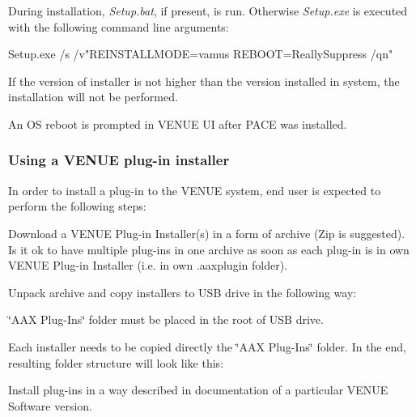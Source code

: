  During installation, {\itshape Setup.\+bat}, if present, is run. Otherwise {\itshape Setup.\+exe} is executed with the following command line arguments\+:

 {\ttfamily Setup.\+exe /s /v"R\+E\+I\+N\+S\+T\+A\+L\+L\+M\+O\+DE=vamus R\+E\+B\+O\+OT=Really\+Suppress /qn"}

 If the version of installer is not higher than the version installed in system, the installation will not be performed.

 An OS reboot is prompted in V\+E\+N\+UE UI after P\+A\+CE was installed.

\hypertarget{a00849_subsection__aax_venue_guide__installer__use}{}\subsubsection{Using a V\+E\+N\+U\+E plug-\/in installer}\label{a00849_subsection__aax_venue_guide__installer__use}
 In order to install a plug-\/in to the V\+E\+N\+UE system, end user is expected to perform the following steps\+: 
\begin{DoxyEnumerate}
\item Download a V\+E\+N\+UE Plug-\/in Installer(s) in a form of archive (Zip is suggested). Is it ok to have multiple plug-\/ins in one archive as soon as each plug-\/in is in own V\+E\+N\+UE Plug-\/in Installer (i.\+e. in own .aaxplugin folder).  
\item Unpack archive and copy installers to U\+SB drive in the following way\+: 
\begin{DoxyEnumerate}
\item \char`\"{}\+A\+A\+X Plug-\/\+Ins\char`\"{} folder must be placed in the root of U\+SB drive.  
\item Each installer needs to be copied directly the \char`\"{}\+A\+A\+X Plug-\/\+Ins\char`\"{} folder. In the end, resulting folder structure will look like this\+:   
\end{DoxyEnumerate}
\item Install plug-\/ins in a way described in documentation of a particular V\+E\+N\+UE Software version.  
\end{DoxyEnumerate}





